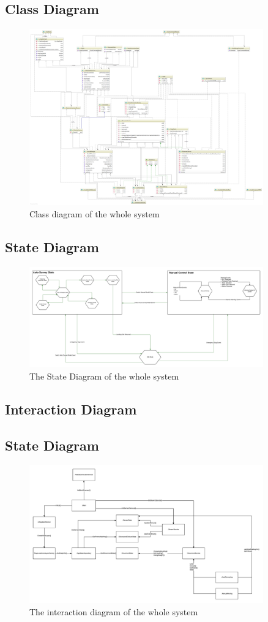 \subsection{Class Diagram}
\begin{figure}
	\centering
	\includegraphics[width=0.9\textwidth]{ClassDiagram.png}	
	\caption{\label{fig:erd}Class diagram of the whole system}
\end{figure}	

\subsection{State Diagram}
\begin{figure}
	\centering
	\includegraphics[width=0.9\textwidth]{StateDiagram.png}	
	\caption{\label{fig:erd}The State Diagram of the whole system}
\end{figure}	

\subsection{Interaction Diagram}
\subsection{State Diagram}
\begin{figure}
	\centering
	\includegraphics[width=0.9\textwidth]{InteractionDiagram.png}	
	\caption{\label{fig:erd}The interaction diagram of the whole system}
\end{figure}	